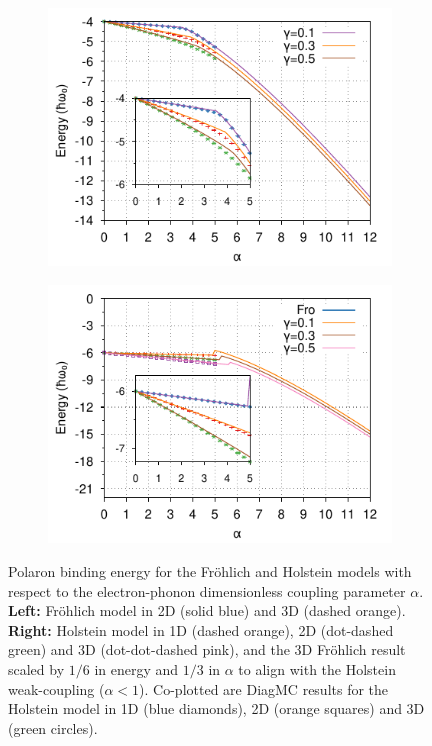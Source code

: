 \begin{figure}
  \begin{subfigure}[b]{0.49\textwidth}
    \includegraphics[width=\textwidth]{figures/holstein-2d-alpha-energy-adiabaticity-diagmc-COLOUR.pdf}
  \end{subfigure}
  \begin{subfigure}[b]{0.49\textwidth}
    \includegraphics[width=\textwidth]{figures/holstein-3d-alpha-energy-adiabaticity-diagmc-COLOUR.pdf}
  \end{subfigure}
  \caption{Polaron binding energy for the Fr\"ohlich and Holstein models with respect to the electron-phonon dimensionless coupling parameter $\alpha$. \textbf{Left:} Fr\"ohlich model in 2D (solid blue) and 3D (dashed orange). \textbf{Right:} Holstein model in 1D (dashed orange), 2D (dot-dashed green) and 3D (dot-dot-dashed pink), and the 3D Fr\"ohlich result scaled by $1/6$ in energy and $1/3$ in $\alpha$ to align with the Holstein weak-coupling ($\alpha < 1$). Co-plotted are DiagMC results for the Holstein model in 1D (blue diamonds), 2D (orange squares) and 3D (green circles).}
  \label{fig:energy_alpha}
\end{figure}

